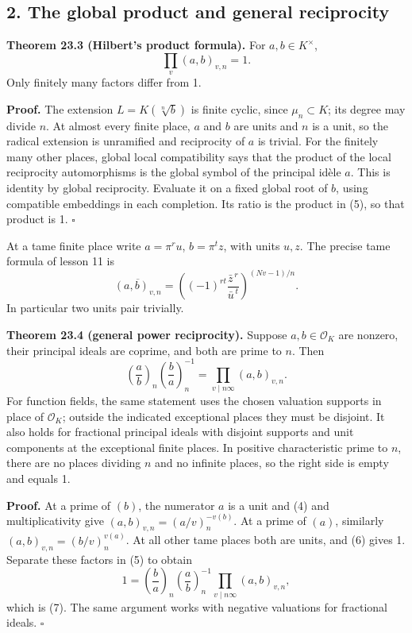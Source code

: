 \documentclass[11pt,a4paper]{article}
\begin{document}
\subsection{2. The global product and general
reciprocity}\label{the-global-product-and-general-reciprocity}

\textbf{Theorem 23.3 (Hilbert's product formula).} For
\(a,b\in K^\times\), \[
\prod_v(a,b)_{v,n}=1.
\tag{5}
\] Only finitely many factors differ from 1.

\textbf{Proof.} The extension \(L=K(\sqrt[n]b)\) is finite cyclic, since
\(\mu_n\subset K\); its degree may divide \(n\). At almost every finite
place, \(a\) and \(b\) are units and \(n\) is a unit, so the radical
extension is unramified and reciprocity of \(a\) is trivial. For the
finitely many other places, global local compatibility says that the
product of the local reciprocity automorphisms is the global symbol of
the principal idèle \(a\). This is identity by global reciprocity.
Evaluate it on a fixed global root of \(b\), using compatible embeddings
in each completion. Its ratio is the product in (5), so that product is
1. \(\square\)

At a tame finite place write \(a=\pi^r u\), \(b=\pi^t z\), with units
\(u,z\). The precise tame formula of lesson 11 is \[
\overline{(a,b)_{v,n}}
=\left((-1)^{rt}\frac{\bar z^{\,r}}{\bar u^{\,t}}\right)^{(Nv-1)/n}.
\tag{6}
\] In particular two units pair trivially.

\textbf{Theorem 23.4 (general power reciprocity).} Suppose
\(a,b\in\mathcal O_K\) are nonzero, their principal ideals are coprime,
and both are prime to \(n\). Then \[
\left(\frac a b\right)_n
\left(\frac b a\right)_n^{-1}
=\prod_{v\mid n\infty}(a,b)_{v,n}.
\tag{7}
\] For function fields, the same statement uses the chosen valuation
supports in place of \(\mathcal O_K\); outside the indicated exceptional
places they must be disjoint. It also holds for fractional principal
ideals with disjoint supports and unit components at the exceptional
finite places. In positive characteristic prime to \(n\), there are no
places dividing \(n\) and no infinite places, so the right side is empty
and equals 1.

\textbf{Proof.} At a prime of \((b)\), the numerator \(a\) is a unit and
(4) and multiplicativity give \((a,b)_{v,n}=(a/v)_n^{-v(b)}\). At a
prime of \((a)\), similarly \((a,b)_{v,n}=(b/v)_n^{v(a)}\). At all other
tame places both are units, and (6) gives 1. Separate these factors in
(5) to obtain \[
1=\left(\frac b a\right)_n
  \left(\frac a b\right)_n^{-1}
  \prod_{v\mid n\infty}(a,b)_{v,n},
\] which is (7). The same argument works with negative valuations for
fractional ideals. \(\square\)
\end{document}
